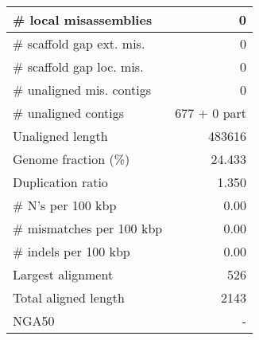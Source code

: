 \documentclass[12pt,a4paper]{article}
\begin{document}
\begin{table}[ht]
\begin{center}
\begin{tabular}{|l*{1}{|r}|}
\# local misassemblies & 0 \\ \hline
\# scaffold gap ext. mis. & 0 \\ \hline
\# scaffold gap loc. mis. & 0 \\ \hline
\# unaligned mis. contigs & 0 \\ \hline
\# unaligned contigs & 677 + 0 part \\ \hline
Unaligned length & 483616 \\ \hline
Genome fraction (\%) & 24.433 \\ \hline
Duplication ratio & 1.350 \\ \hline
\# N's per 100 kbp & 0.00 \\ \hline
\# mismatches per 100 kbp & 0.00 \\ \hline
\# indels per 100 kbp & 0.00 \\ \hline
Largest alignment & 526 \\ \hline
Total aligned length & 2143 \\ \hline
NGA50 & - \\ \hline
\end{tabular}
\end{center}
\end{table}
\end{document}
